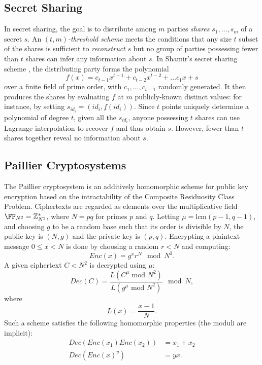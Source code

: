\subsection{Secret Sharing}

In secret sharing, the goal is to distribute among $m$ parties \emph{shares
}$s_{1},\ldots,s_{m}$ of a secret $s$. An \emph{$(t,m)$-threshold
scheme} meets the conditions that any size $t$ subset of the shares is sufficient to \emph{reconstruct
}$s$ but no group of parties possessing fewer than $t$ shares can
infer any information about $s$. In Shamir's secret sharing scheme
\cite{Shamir}, the distributing party forms the polynomial 
\[
f(x)=c_{t-1}x^{t-1}+c_{t-2}x^{t-2}+\ldots c_{1}x+s
\]
over a finite field of prime order, with $c_{1},\ldots, c_{t-1}$ randomly
generated. It then produces the shares by evaluating $f$ at $m$
publicly-known distinct values: for instance, by setting $s_{id_i}=(id_i,f(id_i))$.
Since $t$ points uniquely determine a polynomial of degree $t$,
given all the $s_{id_i}$, anyone possessing $t$ shares can use Lagrange
interpolation to recover $f$ and thus obtain $s$. However, fewer
than $t$ shares together reveal no information about $s$.

\subsection{Paillier Cryptosystems}

The Paillier cryptosystem \cite{Paillier} is an additively homomorphic
scheme for public key encryption based on the intractability of the
Composite Residuosity Class Problem. Ciphertexts are regarded as elements
over the multiplicative field $\FF_{N^2} = \mathbb{Z}_{N^{2}}^{*}$, where $N=pq$
for primes $p$ and $q$. Letting $\mu=\text{lcm}(p-1,q-1)$,
and choosing $g$ to be a random base such that its order is divisible
by $N$, the public key is $(N,g)$ and the private key is $(p,q)$.
Encrypting a plaintext message $0\leq x<N$ is done by choosing a random
$r<N$ and computing: 
\[
Enc(x)=g^{x}r^{N}\mod N^{2}.
\]
A given ciphertext $C<N^{2}$ is decrypted using $\mu$: 
\[
Dec(C)=\frac{L(C^{\mu}\text{ mod }N^{2})}{L(g^{\mu}\text{ mod }N^{2})}\mod N,
\]
where 
\[
L(x)=\frac{x-1}{N}.
\]
Such a scheme satisfies the following homomorphic properties (the
moduli are implicit): 
\begin{align*}
Dec(Enc(x_{1})Enc(x_{2})) & =x_{1}+x_{2}\\
Dec(Enc(x)^{y}) & =yx.
\end{align*}

